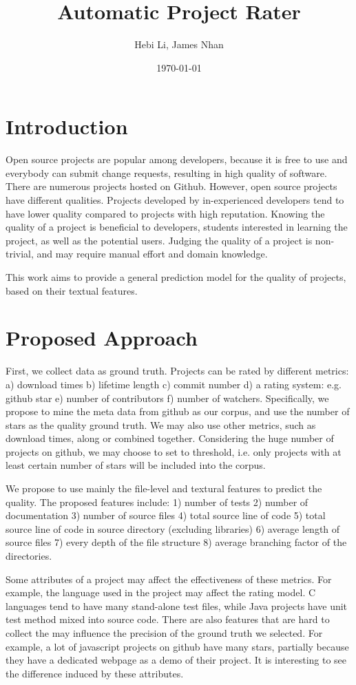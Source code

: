 \documentclass[11pt]{article}
\author{Hebi Li, James Nhan}
\date{\today}
\title{Automatic Project Rater}
\begin{document}
\maketitle

\section{Introduction}
\label{sec:orgheadline1}
Open source projects are popular among developers,
because it is free to use and everybody can submit change requests,
resulting in high quality of software.
There are numerous projects hosted on Github.
However, open source projects have different qualities.
Projects developed by in-experienced developers tend to have lower quality compared to projects with high reputation.
Knowing the quality of a project is beneficial to developers, students interested in learning the project, as well as the potential users.
Judging the quality of a project is non-trivial, and may require manual effort and domain knowledge.

This work aims to provide a general prediction model for the quality of projects, based on their textual features.

\section{Proposed Approach}
\label{sec:orgheadline2}
First, we collect data as ground truth.
Projects can be rated by different metrics:
a) download times
b) lifetime length
c) commit number
d) a rating system: e.g. github star
e) number of contributors
f) number of watchers.
Specifically, we propose to mine the meta data from github as our corpus, and use the number of stars as the quality ground truth.
We may also use other metrics, such as download times, along or combined together.
Considering the huge number of projects on github, we may choose to set to threshold,
i.e. only projects with at least certain number of stars will be included into the corpus.

We propose to use mainly the file-level and textural features to predict the quality.
The proposed features include:
1) number of tests
2) number of documentation
3) number of source files
4) total source line of code
5) total source line of code in source directory (excluding libraries)
6) average length of source files
7) every depth of the file structure
8) average branching factor of the directories.

Some attributes of a project may affect the effectiveness of these metrics.
For example, the language used in the project may affect the rating model.
C languages tend to have many stand-alone test files, while Java projects have unit test method mixed into source code.
There are also features that are hard to collect the may influence the precision of the ground truth we selected.
For example, a lot of javascript projects on github have many stars,
partially because they have a dedicated webpage as a demo of their project.
It is interesting to see the difference induced by these attributes.
\end{document}
